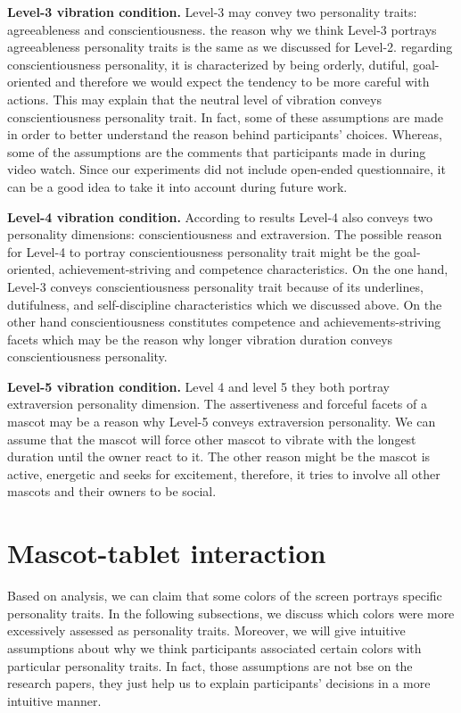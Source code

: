\par\textbf{Level-3 vibration condition.}
Level-3 may convey two personality traits: agreeableness and conscientiousness.
the reason why we think Level-3 portrays agreeableness personality traits is the same as we discussed for Level-2.
regarding conscientiousness personality, it is characterized by being orderly, dutiful, goal-oriented and
therefore we would expect the tendency to be more careful with actions.
This may explain that the neutral level of vibration conveys conscientiousness personality trait.
In fact, some of these assumptions are made in order to better understand the reason behind participants' choices.
Whereas, some of the assumptions are the comments that participants made in during video watch.
Since our experiments did not include open-ended questionnaire, it can be a good idea
to take it into account during future work.

\par\textbf{Level-4 vibration condition.}
According to results Level-4 also conveys two personality dimensions: conscientiousness and extraversion.
The possible reason for Level-4 to portray conscientiousness personality trait might be the
goal-oriented, achievement-striving and competence characteristics.
On the one hand, Level-3 conveys conscientiousness personality trait because of its
underlines, dutifulness, and self-discipline characteristics which we discussed above.
On the other hand conscientiousness constitutes competence and achievements-striving facets which may be the reason
why longer vibration duration conveys conscientiousness personality.

\par\textbf{Level-5 vibration condition.}
Level 4 and level 5 they both portray extraversion personality dimension.
The assertiveness and forceful facets of a mascot may be a reason why Level-5 conveys extraversion personality.
We can assume that the mascot will force other mascot to vibrate with the longest duration until the owner react to it.
The other reason might be the mascot is active, energetic and seeks for excitement,
therefore, it tries to involve all other mascots and their owners to be social.

\section{Mascot-tablet interaction}
\label{sec:mascot-tablet-interaction}
Based on analysis, we can claim that some colors of the screen portrays specific personality traits.
In the following subsections, we discuss which colors were more excessively assessed as personality traits.
Moreover, we will give intuitive assumptions about why we think participants
associated certain colors with particular personality traits.
In fact, those assumptions are not bse on the research papers, they just help us to explain participants’
decisions in a more intuitive manner.

